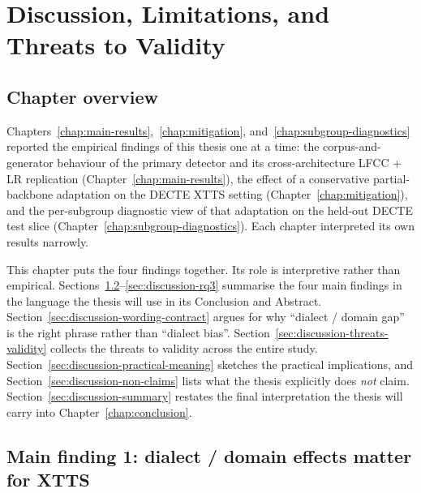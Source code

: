 \cleardoubleoddpage
\chapter{Discussion, Limitations, and Threats to Validity}
\label{chap:discussion}



\section{Chapter overview}
\label{sec:discussion-overview}

Chapters~\ref{chap:main-results},~\ref{chap:mitigation}, and~\ref{chap:subgroup-diagnostics} reported the empirical findings of this thesis
one at a time: the corpus-and-generator behaviour of the primary
detector and its cross-architecture LFCC + LR replication
(Chapter~\ref{chap:main-results}), the effect of a conservative partial-backbone
adaptation on the DECTE XTTS setting (Chapter~\ref{chap:mitigation}), and the
per-subgroup diagnostic view of that adaptation on the held-out
DECTE test slice (Chapter~\ref{chap:subgroup-diagnostics}). Each chapter interpreted its own
results narrowly.

This chapter puts the four findings together. Its role is
interpretive rather than empirical. Sections~\ref{sec:discussion-rq1}--\ref{sec:discussion-rq3} summarise the
four main findings in the language the thesis will use in its
Conclusion and Abstract. Section~\ref{sec:discussion-wording-contract} argues for why ``dialect /
domain gap'' is the right phrase rather than ``dialect bias''.
Section~\ref{sec:discussion-threats-validity} collects the threats to validity across the entire
study. Section~\ref{sec:discussion-practical-meaning} sketches the practical implications, and
Section~\ref{sec:discussion-non-claims} lists what the thesis explicitly does \emph{not} claim.
Section~\ref{sec:discussion-summary} restates the final interpretation the thesis will
carry into Chapter~\ref{chap:conclusion}.


\section{Main finding 1: dialect / domain effects matter for XTTS}
\label{sec:discussion-rq1}

